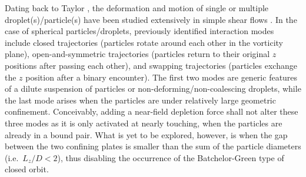 Dating back to Taylor \cite{Taylor501}, the deformation and motion of single or multiple droplet(s)/particle(s) have been studied extensively in simple shear flows \cite{lin_lee_sather_1970,batchelor_green_1972,batchelor_green_1972b,Zinchenko1983,Zinchenko1984,zurita-gotor_2007}. In the case of spherical particles/droplets, previously identified interaction modes include closed trajectories (particles rotate around each other in the vorticity plane), open-and-symmetric trajectories (particles return to their original $z$ positions after passing each other), and swapping trajectories (particles exchange the $z$ position after a binary encounter). The first two modes are generic features of a dilute suspension of particles or non-deforming/non-coalescing droplets, while the last mode arises when the particles are under relatively large geometric confinement. Conceivably, adding a near-field depletion force shall not alter these three modes as it is only activated at nearly touching, when the particles are already in a bound pair. What is yet to be explored, however, is when the gap between the two confining plates is smaller than the sum of the particle diameters (i.e.\ $L_z/D<2$), thus disabling the occurrence of the Batchelor-Green type of closed orbit.

